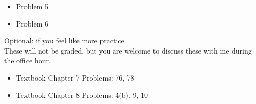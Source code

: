 \documentclass[11pt]{article}
\begin{document}
\begin{itemize}



   \item 
   Problem 5
   
    \item
    Problem 6

\end{itemize}



\vspace{12pt}

\underline{Optional: if you feel like more practice}\\
These will not be graded, but you are welcome to discuss these with me during the office hour.

\begin{itemize}


\item Textbook  Chapter 7 Problems: 76, 78
\item Textbook  Chapter 8 Problems: 4(b), 9, 10

\end{itemize}
\end{document}
